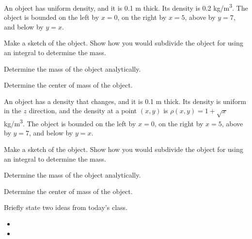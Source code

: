 \begin{problem}
\item An object has uniform density, and it is 0.1 m thick. Its
  density is 0.2 kg/m\textsuperscript{3}. The object is bounded on the
  left by $x=0$, on the right by $x=5$, above by $y=7$, and below by
  $y=x$.
  \begin{subproblem}
    \item Make a sketch of the object. Show how you would subdivide
      the object for using an integral to determine the mass.
      \vfill
    \item Determine the mass of the object analytically.
      \vfill
    \item Determine the center of mass of the object.
      \vfill
  \end{subproblem}
  \clearpage

\item An object has a density that changes, and it is 0.1 m thick. Its
  density is uniform in the $z$ direction, and the density at a point
  $(x,y)$ is $\rho(x,y)=1+\sqrt{x}$ kg/m\textsuperscript{3}. The
  object is bounded on the left by $x=0$, on the right by $x=5$, above
  by $y=7$, and below by $y=x$.
  \begin{subproblem}
    \item Make a sketch of the object. Show how you would subdivide
      the object for using an integral to determine the mass.
      \vfill
    \item Determine the mass of the object analytically.
      \vfill
    \item Determine the center of mass of the object.
      \vfill
  \end{subproblem}

\end{problem}

\postClass

\begin{problem}
\item Briefly state two ideas from today's class.
  \begin{itemize}
  \item 
  \item 
  \end{itemize}
\item 
  \begin{subproblem}
    \item
  \end{subproblem}
\end{problem}

